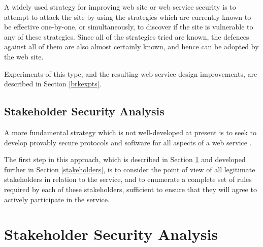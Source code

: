 A widely used strategy for improving web site or web service security is
to attempt to attack the site by using the strategies which are currently
known to be effective one-by-one, or simultaneously, to discover if the
site is vulnerable to any of these strategies. Since all of the strategies
tried are known, the defences against all of them are also almost certainly
known, and hence can be adopted by the web site.

Experiments of this type, and the resulting web service design improvements,
are described in Section \ref{brkexpts}.



\subsection{Stakeholder Security Analysis}\label{stsecanal}

A more fundamental strategy which is not well-developed at present is
to seek to develop provably secure protocols and software for all aspects
of a web service \cite{whitman2011principles,mailloux2018examination,bishop2005introduction}.

The first step in this approach, which is described in Section \ref{stkanalch3} and developed further in 
Section \ref{stakeholders}, is to consider the point of view of all legitimate stakeholders
in relation to the service, and to enumerate a complete set of rules
required by each of these stakeholders, sufficient to ensure that they
will agree to actively participate in the service.


\section{Stakeholder Security Analysis}\label{stkanalch3}

